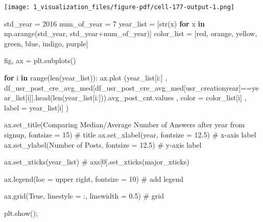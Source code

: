 \documentclass[
  letterpaper,
  DIV=11,
  numbers=noendperiod]{scrartcl}
\newenvironment{Shaded}{\begin{snugshade}}{\end{snugshade}}
\newcommand{\BuiltInTok}[1]{\textcolor[rgb]{0.00,0.23,0.31}{#1}}
\newcommand{\CommentTok}[1]{\textcolor[rgb]{0.37,0.37,0.37}{#1}}
\newcommand{\ControlFlowTok}[1]{\textcolor[rgb]{0.00,0.23,0.31}{\textbf{#1}}}
\newcommand{\DecValTok}[1]{\textcolor[rgb]{0.68,0.00,0.00}{#1}}
\newcommand{\FloatTok}[1]{\textcolor[rgb]{0.68,0.00,0.00}{#1}}
\newcommand{\KeywordTok}[1]{\textcolor[rgb]{0.00,0.23,0.31}{\textbf{#1}}}
\newcommand{\NormalTok}[1]{\textcolor[rgb]{0.00,0.23,0.31}{#1}}
\newcommand{\OperatorTok}[1]{\textcolor[rgb]{0.37,0.37,0.37}{#1}}
\newcommand{\StringTok}[1]{\textcolor[rgb]{0.13,0.47,0.30}{#1}}
\newcommand{\VariableTok}[1]{\textcolor[rgb]{0.07,0.07,0.07}{#1}}
\begin{document}
\texttt{[image: 1\_visualization\_files/figure-pdf/cell-177-output-1.png]}

\begin{Shaded}
\begin{Highlighting}[]
\NormalTok{std\_year }\OperatorTok{=} \DecValTok{2016}
\NormalTok{num\_of\_year }\OperatorTok{=} \DecValTok{7}
\NormalTok{year\_list }\OperatorTok{=}\NormalTok{ [}\BuiltInTok{str}\NormalTok{(x) }\ControlFlowTok{for}\NormalTok{ x }\KeywordTok{in}\NormalTok{ np.arange(std\_year, std\_year}\OperatorTok{+}\NormalTok{num\_of\_year)]}
\NormalTok{color\_list }\OperatorTok{=}\NormalTok{ [}\StringTok{\textquotesingle{}red\textquotesingle{}}\NormalTok{, }\StringTok{\textquotesingle{}orange\textquotesingle{}}\NormalTok{, }\StringTok{\textquotesingle{}yellow\textquotesingle{}}\NormalTok{, }\StringTok{\textquotesingle{}green\textquotesingle{}}\NormalTok{, }\StringTok{\textquotesingle{}blue\textquotesingle{}}\NormalTok{, }\StringTok{\textquotesingle{}indigo\textquotesingle{}}\NormalTok{, }\StringTok{\textquotesingle{}purple\textquotesingle{}}\NormalTok{]}

\NormalTok{fig, ax }\OperatorTok{=}\NormalTok{ plt.subplots()}

\ControlFlowTok{for}\NormalTok{ i }\KeywordTok{in} \BuiltInTok{range}\NormalTok{(}\BuiltInTok{len}\NormalTok{(year\_list)):   }
\NormalTok{        ax.plot (year\_list[i:]}
\NormalTok{        , df\_usr\_post\_cre\_avg\_med[df\_usr\_post\_cre\_avg\_med[}\StringTok{\textquotesingle{}usr\_creationyear\textquotesingle{}}\NormalTok{]}\OperatorTok{==}\NormalTok{year\_list[i]].head(}\BuiltInTok{len}\NormalTok{(year\_list[i:])).avg\_post\_cnt.values}
\NormalTok{        ,  color }\OperatorTok{=}\NormalTok{ color\_list[i]}
\NormalTok{        ,  label }\OperatorTok{=}\NormalTok{ year\_list[i]}
\NormalTok{        ) }


\NormalTok{ax.set\_title(}\StringTok{\textquotesingle{}Comparing Median/Average Number of Answers after year from signup\textquotesingle{}}\NormalTok{, fontsize }\OperatorTok{=} \DecValTok{15}\NormalTok{) }\CommentTok{\# title}
\NormalTok{ax.set\_xlabel(}\StringTok{\textquotesingle{}year\textquotesingle{}}\NormalTok{, fontsize }\OperatorTok{=} \FloatTok{12.5}\NormalTok{) }\CommentTok{\# x{-}axis label}
\NormalTok{ax.set\_ylabel(}\StringTok{\textquotesingle{}Number of Posts\textquotesingle{}}\NormalTok{, fontsize }\OperatorTok{=} \FloatTok{12.5}\NormalTok{) }\CommentTok{\# y{-}axis label}

\NormalTok{ax.set\_xticks(year\_list)}
\CommentTok{\# axs[0].set\_xticks(major\_xticks)}

\NormalTok{ax.legend(loc }\OperatorTok{=} \StringTok{\textquotesingle{}upper right\textquotesingle{}}\NormalTok{, fontsize }\OperatorTok{=} \DecValTok{10}\NormalTok{) }\CommentTok{\# add legend}

\NormalTok{ax.grid(}\VariableTok{True}\NormalTok{, linestyle }\OperatorTok{=} \StringTok{\textquotesingle{}:\textquotesingle{}}\NormalTok{, linewidth }\OperatorTok{=} \FloatTok{0.5}\NormalTok{) }\CommentTok{\# grid}

\NormalTok{plt.show()}\OperatorTok{;}
\end{Highlighting}
\end{Shaded}
\end{document}
